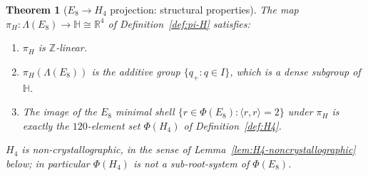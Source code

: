 \documentclass[11pt, a4paper]{amsart}
\newtheorem{theorem}{Theorem}[section]
\theoremstyle{definition}
\newcommand{\R}{\mathbb{R}}
\newcommand{\Z}{\mathbb{Z}}
\newcommand{\HH}{\mathbb{H}}
\begin{document}
\begin{theorem}[$E_8 \to H_4$ projection: structural properties]
\label{thm:pi-H}
The map $\pi_H \colon \Lambda(E_8) \to \HH \cong \R^4$ of
Definition~\ref{def:pi-H} satisfies:
\begin{enumerate}
\item $\pi_H$ is $\Z$-linear.
\item $\pi_H(\Lambda(E_8))$ is the additive group
  $\{q_+ : q \in I\}$, which is a dense subgroup of $\HH$.
\item The image of the $E_8$ minimal shell $\{r \in \Phi(E_8) :
  \langle r, r \rangle = 2\}$ under $\pi_H$ is exactly the
  $120$-element set $\Phi(H_4)$ of Definition~\ref{def:H4}.
\end{enumerate}
$H_4$ is non-crystallographic, in the sense of
Lemma~\ref{lem:H4-noncrystallographic} below; in particular
$\Phi(H_4)$ is \emph{not} a sub-root-system of $\Phi(E_8)$.
\end{theorem}
\end{document}
